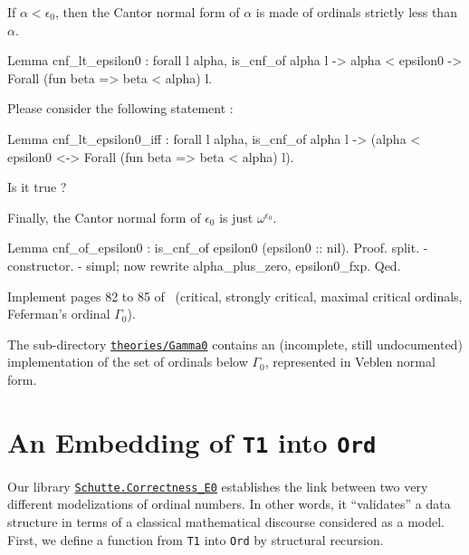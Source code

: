 {If $\alpha<\epsilon_0$, then the Cantor normal form of $\alpha$ is made of ordinals strictly less than $\alpha$.

\begin{Coqsrc}
Lemma cnf_lt_epsilon0 : 
 forall l alpha, 
   is_cnf_of alpha l ->  alpha < epsilon0 ->
   Forall (fun beta =>  beta < alpha) l.
\end{Coqsrc}


\begin{exercise}
Please consider the following statement :

\begin{Coqsrc}
Lemma cnf_lt_epsilon0_iff : 
 forall l alpha, 
   is_cnf_of alpha l ->  
   (alpha < epsilon0 <->  Forall (fun beta =>  beta < alpha) l).
\end{Coqsrc}

Is it true ?
\end{exercise}

Finally, the Cantor normal form of $\epsilon_0$ is just $\omega^{\epsilon_0}$.

\begin{Coqsrc}
Lemma cnf_of_epsilon0 : is_cnf_of epsilon0 (epsilon0 :: nil).
Proof.
  split.
  - constructor.  
  - simpl;  now rewrite alpha_plus_zero, epsilon0_fxp.
Qed.
\end{Coqsrc}


\begin{project}
Implement pages 82 to 85 of~\cite{schutte} (critical, strongly critical, maximal critical ordinals, Feferman's ordinal $\Gamma_0$).
\end{project}

\begin{remark}
The sub-directory \href{../theories/html/hydras.Gamma0.html}%
{\texttt{theories/Gamma0}} contains an (incomplete, still undocumented) implementation of the set of ordinals below $\Gamma_0$, represented in Veblen normal form. 
\end{remark}

\section{An Embedding of \texttt{T1} into \texttt{Ord}}


Our library 
\href{../theories/html/hydras.Schutte.correctness_E0.html}%
{\texttt{Schutte.Correctness\_E0}} establishes the link between two very different modelizations of ordinal numbers. In other words, it ``validates'' a data structure in terms of
a classical mathematical discourse considered as a model. 
First, we define a function from \texttt{T1} into  \texttt{Ord} by structural recursion.

}
